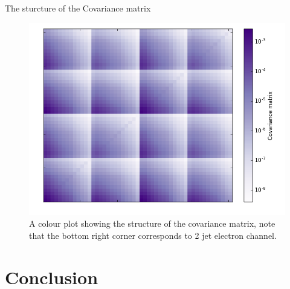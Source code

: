 \documentclass[14pt]{beamer}
\begin{document}
\begin{frame}[fragile]{The sturcture of the Covariance matrix}

\begin{figure} 
	\begin{center}
		\includegraphics[width=0.7 \textwidth]{colourplot_C_full.png}
		\caption{A colour plot showing the structure of the covariance matrix, note that the bottom right corner corresponds to 2 jet electron channel. }
		\label{Cfull
		}
	\end{center}
\end{figure}
\end{frame}
	
	






\section{Conclusion}
\end{document}
